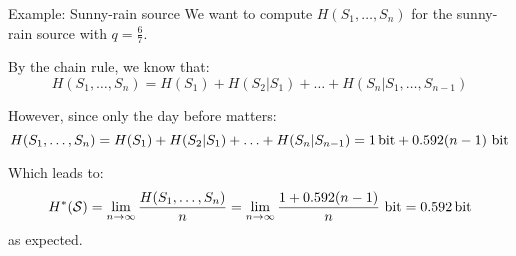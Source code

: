 \documentclass[a4paper]{article}
\begin{document}
\begin{parag}{Example: Sunny-rain source}
    We want to compute $H\left(S_1, \ldots, S_n\right)$ for the sunny-rain source with $q = \frac{6}{7}$.

    By the chain rule, we know that: 
    \[H\left(S_1, \ldots, S_n\right) = H\left(S_1\right) + H\left(S_2 | S_1\right) + \ldots + H\left(S_n | S_1, \ldots, S_{n-1}\right)\]

    However, since only the day before matters: 
    \[H\left(S_1, \ldots, S_n\right) = H\left(S_1\right) + H\left(S_2 | S_1\right) + \ldots + H\left(S_n | S_{n-1}\right) = \SI{1}{\bit} + 0.592\left(n-1\right)~\si{\bit}\]

    Which leads to: 
    \[H^*\left(\mathcal{S}\right) = \lim_{n \to \infty} \frac{H\left(S_1, \ldots, S_n\right)}{n} = \lim_{n \to \infty} \frac{1 + 0.592\left(n-1\right)}{n}~\si{\bit} = \SI{0.592}{\bit}\]
    as expected.
\end{parag}
\end{document}
